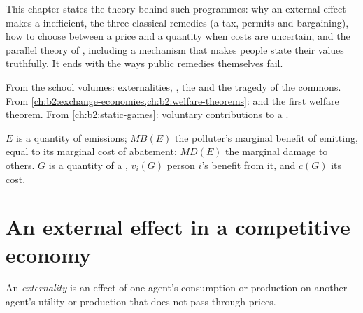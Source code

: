 This chapter states the theory behind such programmes: why an external effect makes a 
inefficient, the three classical remedies (a tax, permits and bargaining), how to choose between a price and a quantity
when costs are uncertain, and the parallel theory of , including a mechanism that makes people state their
values truthfully. It ends with the ways public remedies themselves fail.

\begin{recall}
From the school volumes: externalities, , the  and the tragedy of the commons. From
\cref{ch:b2:exchange-economies,ch:b2:welfare-theorems}:  and the first welfare theorem. From
\cref{ch:b2:static-games}: voluntary contributions to a .
\end{recall}

\begin{notation}\label{not:b2:externalities-and-public-goods-theory:symbols}
$E$ is a quantity of emissions; $\mathit{MB}(E)$ the polluter's marginal benefit of emitting, equal to its marginal cost of
abatement; $\mathit{MD}(E)$ the marginal damage to others. $G$ is a quantity of a , $v_i(G)$ person $i$'s benefit from it, and
$c(G)$ its cost.
\end{notation}

\section{An external effect in a competitive economy}\label{sec:b2:externalities-and-public-goods-theory:inefficiency}

\begin{definition}[Externality]\label{def:b2:externalities-and-public-goods-theory:externality}
An \emph{externality} is an effect of one agent's consumption or production on another agent's
utility or production that does not pass through prices.
\end{definition}

